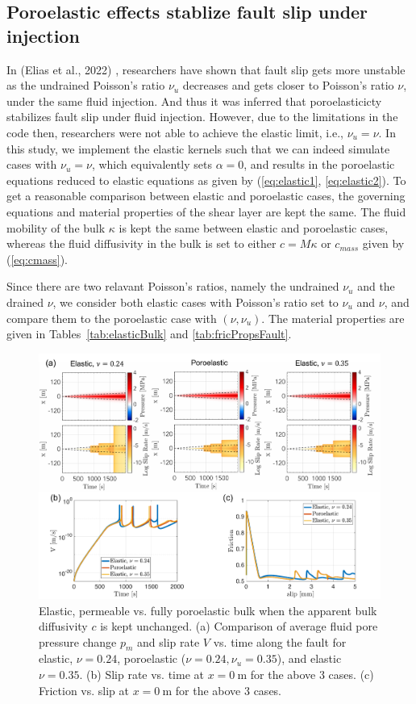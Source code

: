 \subsection{Poroelastic effects stablize fault slip under injection}
In (Elias et al., 2022) \cite{Elias_Shengduo_2022}, 
researchers have shown that fault slip gets more unstable as the undrained Poisson's ratio $\nu_u$ decreases and gets closer to Poisson's ratio $\nu$, 
under the same fluid injection. 
And thus it was inferred that poroelasticicty stabilizes fault slip under fluid injection. 
However, 
due to the limitations in the code then, 
researchers were not able to achieve the elastic limit, i.e.,  $\nu_u = \nu$. 
In this study, 
we implement the elastic kernels such that we can indeed simulate cases with $\nu_u = \nu$, 
which equivalently sets $\alpha = 0$, 
and results in the poroelastic equations reduced to elastic equations as given by (\ref{eq:elastic1}, \ref{eq:elastic2}). 
To get a reasonable comparison between elastic and poroelastic cases, 
the governing equations and material properties of the shear layer are kept the same. 
The fluid mobility of the bulk $\kappa$ is kept the same between elastic and poroelastic cases, 
whereas the fluid diffusivity in the bulk is set to either $c=M\kappa$ or $c_{mass}$ given by (\ref{eq:cmass}). 

Since there are two relavant Poisson's ratios, 
namely the undrained $\nu_u$ and the drained $\nu$, 
we consider both elastic cases with Poisson's ratio set to $\nu_u$ and $\nu$, 
and compare them to the poroelastic case with $(\nu, \nu_u)$. 
The material properties are given in Tables~\ref{tab:elasticBulk} and \ref{tab:fricPropsFault}. 

\begin{figure}[htbp]
    \centering
    \includegraphics[width=1.0\textwidth]{figures/ElastPoro_c.pdf}
    \caption{Elastic, permeable vs. fully poroelastic bulk when the apparent bulk diffusivity $c$ is kept unchanged. (a) Comparison of average fluid pore pressure change $p_m$ and slip rate $V$ vs. time along the fault for elastic, $\nu = 0.24$, poroelastic ($\nu = 0.24, \nu_u = 0.35$), and elastic $\nu = 0.35$. 
    (b) Slip rate vs. time at $x = 0\ \mathrm{m}$ for the above 3 cases. 
    (c) Friction vs. slip at $x = 0\ \mathrm{m}$ for the above 3 cases.}
    \label{fig:ElastPoroC}
\end{figure}

